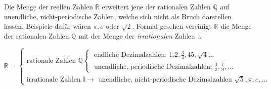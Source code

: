 
Die Menge der reellen Zahlen $\mathbb{R}$ erweitert jene der rationalen Zahlen $\mathbb{Q}$ auf unendliche, nicht-periodische Zahlen, welche sich nicht als Bruch darstellen lassen. Beispiele daf\"{u}r w\"{a}ren $\pi, e$ oder $\sqrt{2}$. Formal gesehen vereinigt $\mathbb{R}$ die Menge der rationalen Zahlen $\mathbb{Q}$ mit der Menge der \emph{irrationalen} Zahlen $\mathbb{I}$. 

\begin{figure}[h!]
\end{figure}
$$
\mathbb{R} =
\begin{cases}
	\text{rationale Zahlen } \mathbb{Q}
	\begin{cases}
		\text{ endliche Dezimalzahlen: } 1.2, \frac{3}{4}, 45, \sqrt{4} \ldots
		\\
		\text{ unendliche, periodische Dezimalzahlen: } \frac{1}{3}, \frac{7}{9}, \ldots
	\end{cases}
	\\
	\text{irrationale Zahlen } \mathbb{I} \rightarrow
	\text{ unendliche, nicht-periodische Dezimalzahlen } \sqrt{5}, \pi, e, \ldots
\end{cases}
$$

